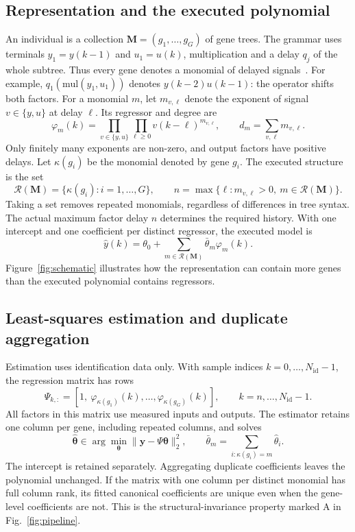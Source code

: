 \documentclass[11pt,a4paper]{article}
\theoremstyle{definition}
\theoremstyle{plain}
\theoremstyle{remark}
\newcommand{\M}{\mathbf{M}}
\begin{document}
\subsection{Representation and the executed polynomial}
An individual is a collection $\M=(g_1,\ldots,g_G)$ of gene trees. The grammar uses terminals $y_1=y(k-1)$ and $u_1=u(k)$, multiplication and a delay $q_j$ of the whole subtree. Thus every gene denotes a monomial of delayed signals~\cite{Searson2015,mggpy}. For example, $q_1(\mathrm{mul}(y_1,u_1))$ denotes $y(k-2)u(k-1)$: the operator shifts both factors. For a monomial $m$, let $m_{v,\ell}$ denote the exponent of signal $v\in\{y,u\}$ at delay $\ell$. Its regressor and degree are
\begin{equation}
\varphi_m(k)=\prod_{v\in\{y,u\}}\prod_{\ell\ge0}v(k-\ell)^{m_{v,\ell}},
\qquad d_m=\sum_{v,\ell}m_{v,\ell}.
\label{eq:monomial}
\end{equation}
Only finitely many exponents are non-zero, and output factors have positive delays. Let $\kappa(g_i)$ be the monomial denoted by gene $g_i$. The executed structure is the set
\begin{equation}
\mathcal R(\M)=\{\kappa(g_i):i=1,\ldots,G\},\qquad
n=\max\{\ell:m_{v,\ell}>0,\ m\in\mathcal R(\M)\}.
\label{eq:structure}
\end{equation}
Taking a set removes repeated monomials, regardless of differences in tree syntax. The actual maximum factor delay $n$ determines the required history. With one intercept and one coefficient per distinct regressor, the executed model is
\begin{equation}
\hat y(k)=\theta_0+\sum_{m\in\mathcal R(\M)}\bar\theta_m\varphi_m(k).
\label{eq:model}
\end{equation}
Figure~\ref{fig:schematic} illustrates how the representation can contain more genes than the executed polynomial contains regressors.

\subsection{Least-squares estimation and duplicate aggregation}
Estimation uses identification data only. With sample indices $k=0,\ldots,N_{\mathrm{id}}-1$, the regression matrix has rows
\begin{equation}
\Psi_{k,:}=[1,\ \varphi_{\kappa(g_1)}(k),\ldots,\varphi_{\kappa(g_G)}(k)],
\qquad k=n,\ldots,N_{\mathrm{id}}-1.
\end{equation}
All factors in this matrix use measured inputs and outputs. The estimator retains one column per gene, including repeated columns, and solves
\begin{equation}
\hat{\boldsymbol\theta}\in\arg\min_{\boldsymbol\theta}
\|\mathbf y-\Psi\boldsymbol\theta\|_2^2,
\qquad
\bar\theta_m=\sum_{i:\kappa(g_i)=m}\hat\theta_i.
\label{eq:ls}
\end{equation}
The intercept is retained separately. Aggregating duplicate coefficients leaves the polynomial unchanged. If the matrix with one column per distinct monomial has full column rank, its fitted canonical coefficients are unique even when the gene-level coefficients are not. This is the structural-invariance property marked A in Fig.~\ref{fig:pipeline}.
\end{document}
